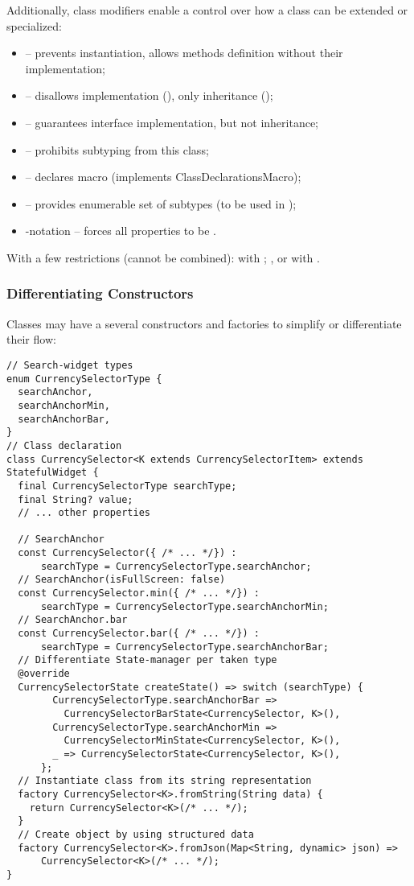 \noindent Additionally, class modifiers enable a control over how a class can be extended or specialized:

\begin{itemize}
  \item {} -- prevents instantiation, allows methods definition without their implementation;
  \item {} -- disallows implementation (), only inheritance ();
  \item {} -- guarantees interface implementation, but not inheritance;
  \item {} -- prohibits subtyping from this class;
  \item {} -- declares macro (implements ClassDeclarationsMacro); 
  \item {} -- provides enumerable set of subtypes (to be used in );
  \item {}-notation -- forces all properties to be .
\end{itemize}

\noindent With a few restrictions (cannot be combined):  with ; ,  or 
 with .


\subsubsection{Differentiating Constructors}

Classes may have a several constructors and factories to simplify or differentiate their flow:

\begin{lstlisting}
// Search-widget types
enum CurrencySelectorType {
  searchAnchor,
  searchAnchorMin,
  searchAnchorBar,
}
// Class declaration
class CurrencySelector<K extends CurrencySelectorItem> extends StatefulWidget {
  final CurrencySelectorType searchType;
  final String? value;
  // ... other properties

  // SearchAnchor
  const CurrencySelector({ /* ... */}) : 
      searchType = CurrencySelectorType.searchAnchor;
  // SearchAnchor(isFullScreen: false)
  const CurrencySelector.min({ /* ... */}) : 
      searchType = CurrencySelectorType.searchAnchorMin;
  // SearchAnchor.bar
  const CurrencySelector.bar({ /* ... */}) : 
      searchType = CurrencySelectorType.searchAnchorBar;
  // Differentiate State-manager per taken type
  @override
  CurrencySelectorState createState() => switch (searchType) {
        CurrencySelectorType.searchAnchorBar =>
          CurrencySelectorBarState<CurrencySelector, K>(),
        CurrencySelectorType.searchAnchorMin =>
          CurrencySelectorMinState<CurrencySelector, K>(),
        _ => CurrencySelectorState<CurrencySelector, K>(),
      };
  // Instantiate class from its string representation 
  factory CurrencySelector<K>.fromString(String data) {
    return CurrencySelector<K>(/* ... */);
  }
  // Create object by using structured data
  factory CurrencySelector<K>.fromJson(Map<String, dynamic> json) =>
      CurrencySelector<K>(/* ... */);
}
\end{lstlisting}


